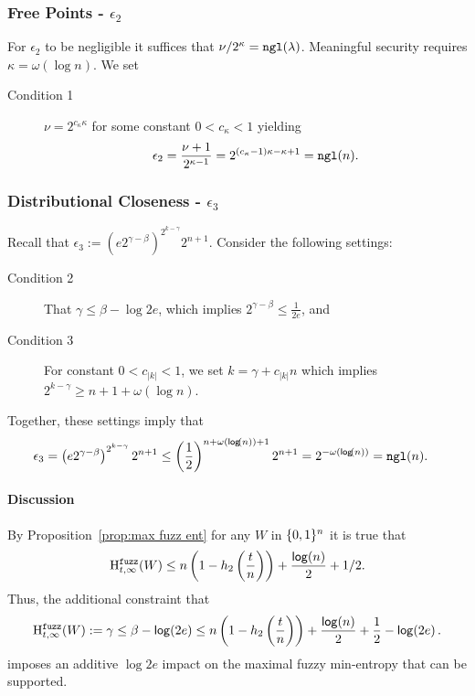 \subsubsection{Free Points - $\epsilon_2$}
For $\epsilon_2$ to be negligible it suffices that $\nu/2^\kappa = \mathtt{ngl}(\lambda)$.  Meaningful security requires $\kappa = \omega(\log{n})$.  We set
\begin{description}
\item[Condition 1] $\nu = 2^{c_{\kappa}\kappa}$ for some constant $0 < c_{\kappa}<1$ yielding
\[
\epsilon_2= \frac{\nu+1}{2^{\kappa-1}} = 2^{(c_{\kappa}-1)\kappa-\kappa+1} = \mathtt{ngl}(n).
\]
\end{description} 
\subsubsection{Distributional Closeness - $\epsilon_3$}
Recall that $\epsilon_3:=\left(e2^{\gamma-\beta}\right)^{2^{k-\gamma}}2^{n+1}$.  Consider the following settings:
\begin{description}
\item[Condition 2] That $\gamma\le \beta-\log{2e}$, which implies $2^{\gamma - \beta} \le \frac{1}{2e}$, and 
\item[Condition 3] For constant $0<c_{|k|} < 1$, we set $k = \gamma + c_{|k|}n$ which implies $2^{k-\gamma}\ge n+1+\omega(\log{n})$. 
\end{description}
Together, these settings imply that 
\begin{align*}
\epsilon_3&=\left(e2^{\gamma-\beta}\right)^{2^{k-\gamma}}2^{n+1}
\le\left(\frac{1}{2}\right)^{n+\omega(\mathsf{log}\!\left(n\right))+1}2^{n+1}= 2^{-\omega(\mathsf{log}\!\left(n\right))} = \mathtt{ngl}(n).
\end{align*}

\paragraph{Discussion}
By Proposition~\ref{prop:max fuzz ent} for any $W$ in $\{0, 1\}^n$ it is true that \[
\mathrm{H}^{\mathtt{fuzz}}_{t,\infty}(W)\le n\left(1-h_2\left(\frac{t}{n}\right)\right)+ \frac{\mathsf{log}\!\left(n\right)}{2} +1/2.\]  Thus, the additional constraint that 
\[
\mathrm{H}^{\mathtt{fuzz}}_{t,\infty}(W):=\gamma \le \beta - \mathsf{log}\!\left(2e\right)
\le n\left(1-h_2\left(\frac{t}{n}\right)\right)+\frac{\mathsf{log}\!\left(n\right)}{2}+\frac{1}{2}-\mathsf{log}\!\left(2e\right).\] imposes an additive $\log{2e}$ impact on the maximal fuzzy min-entropy that can be supported. 


